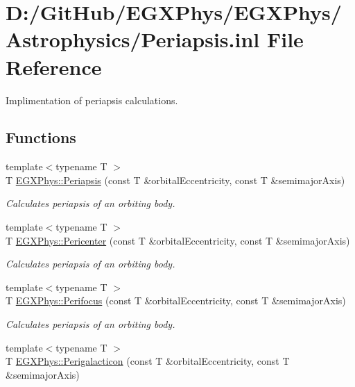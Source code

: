\hypertarget{_periapsis_8inl}{}\section{D\+:/\+Git\+Hub/\+E\+G\+X\+Phys/\+E\+G\+X\+Phys/\+Astrophysics/\+Periapsis.inl File Reference}
\label{_periapsis_8inl}


Implimentation of periapsis calculations.  


\subsection*{Functions}
\begin{DoxyCompactItemize}
\item 
{\footnotesize template$<$typename T $>$ }\\T \mbox{\hyperlink{group___e_g_x_phys-_periapsis_ga4414ac75539371ec874a3d25cad6c9fe}{E\+G\+X\+Phys\+::\+Periapsis}} (const T \&orbital\+Eccentricity, const T \&semimajor\+Axis)
\begin{DoxyCompactList}\small\item\em Calculates periapsis of an orbiting body. \end{DoxyCompactList}\item 
{\footnotesize template$<$typename T $>$ }\\T \mbox{\hyperlink{group___e_g_x_phys-_periapsis_gac4c419a87a5802cf6afc98f50792e99f}{E\+G\+X\+Phys\+::\+Pericenter}} (const T \&orbital\+Eccentricity, const T \&semimajor\+Axis)
\begin{DoxyCompactList}\small\item\em Calculates periapsis of an orbiting body. \end{DoxyCompactList}\item 
{\footnotesize template$<$typename T $>$ }\\T \mbox{\hyperlink{group___e_g_x_phys-_periapsis_gaff62669fb364a245cb85f9a91d8ea71f}{E\+G\+X\+Phys\+::\+Perifocus}} (const T \&orbital\+Eccentricity, const T \&semimajor\+Axis)
\begin{DoxyCompactList}\small\item\em Calculates periapsis of an orbiting body. \end{DoxyCompactList}\item 
{\footnotesize template$<$typename T $>$ }\\T \mbox{\hyperlink{group___e_g_x_phys-_periapsis_ga074fecab96b90bebffa512a37e52d90b}{E\+G\+X\+Phys\+::\+Perigalacticon}} (const T \&orbital\+Eccentricity, const T \&semimajor\+Axis)

\end{DoxyCompactItemize}
